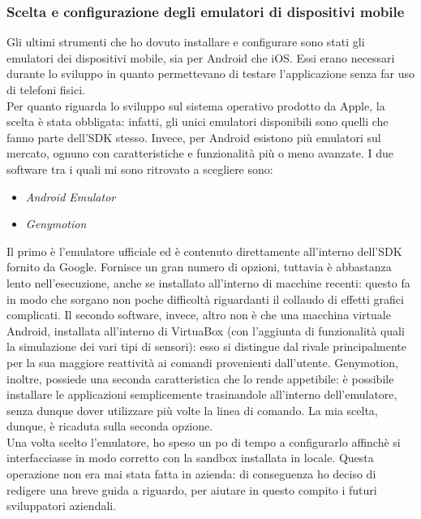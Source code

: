 			\subsubsection{Scelta e configurazione degli emulatori di dispositivi mobile}
				Gli ultimi strumenti che ho dovuto installare e configurare sono stati gli emulatori dei dispositivi mobile, sia per
				Android che iOS. Essi erano necessari durante lo sviluppo in quanto permettevano di testare l'applicazione senza far
				uso di telefoni fisici.\\
				Per quanto riguarda lo sviluppo sul sistema operativo prodotto da Apple, la scelta è stata obbligata: infatti, gli
				unici emulatori disponibili sono quelli che fanno parte dell'SDK stesso. Invece, per Android esistono più
				emulatori sul mercato, ognuno con caratteristiche e funzionalità più o meno avanzate. I due software tra i quali mi
				sono ritrovato a scegliere sono:
				\begin{itemize}
					\item \emph{Android Emulator}
					\item \emph{Genymotion}
				\end{itemize}
				Il primo è l'emulatore ufficiale ed è contenuto direttamente all'interno dell'SDK fornito da Google. Fornisce un
				gran numero di opzioni, tuttavia è abbastanza lento nell'esecuzione, anche se installato all'interno di macchine
				recenti: questo fa in modo che sorgano non poche difficoltà riguardanti il collaudo di effetti grafici complicati. Il
				secondo software, invece, altro non è che una macchina virtuale Android, installata all'interno di VirtuaBox (con
				l'aggiunta di funzionalità quali la simulazione dei vari tipi di sensori): esso si distingue dal rivale
				principalmente per la sua maggiore reattività ai comandi provenienti dall'utente. Genymotion, inoltre, possiede una
				seconda caratteristica che lo rende appetibile: è possibile installare le applicazioni semplicemente trasinandole
				all'interno dell'emulatore, senza dunque dover utilizzare più volte la linea di comando. La mia scelta, dunque, è
				ricaduta sulla seconda opzione.\\
				Una volta scelto l'emulatore, ho speso un po di tempo a configurarlo affinchè si interfacciasse in modo corretto con
				la sandbox installata in locale. Questa operazione non era mai stata fatta in azienda: di conseguenza ho deciso di
				redigere una breve guida a riguardo, per aiutare in questo compito i futuri sviluppatori aziendali.
